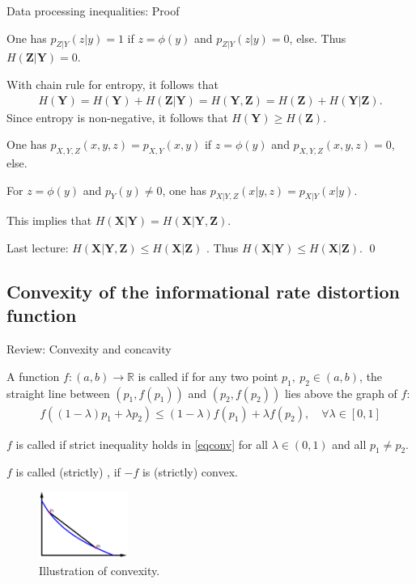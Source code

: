 \begin{frame}{Data processing inequalities: Proof}
\bit 
\item One has $p_{Z|Y}(z|y)=1$ if $z=\phi(y)$ and $p_{Z|Y}(z|y)=0$, else. Thus
$H(\mathbf{Z}|\mathbf{Y})=0$.
\item With chain rule for entropy, it follows that
\begin{align*}
H(\mathbf{Y})=H(\mathbf{Y})+H(\mathbf{Z}|\mathbf{Y})=H(\mathbf{Y},\mathbf{Z})=H(\mathbf{Z})+H(\mathbf{Y}|\mathbf{Z}).
\end{align*}
Since entropy is non-negative, it follows that $H(\mathbf{Y})\geq H(\mathbf{Z})$.
\item 
One has $p_{X,Y,Z}(x,y,z)=p_{X,Y}(x,y)$ if $z=\phi(y)$ and $p_{X,Y,Z}(x,y,z)=0$, else. 
\item For $z=\phi(y)$ and 
$p_Y(y)\neq 0$, one has $p_{X|Y,Z}(x|y,z)=p_{X|Y}(x|y)$.
\item[\iarrow] This implies that $H(\mathbf{X}|\mathbf{Y})=H(\mathbf{X}|\mathbf{Y},\mathbf{Z})$.
\item Last lecture: $H(\mathbf{X}|\mathbf{Y},\mathbf{Z})\leq H(\mathbf{X}|\mathbf{Z})$ .
Thus $H(\mathbf{X}|\mathbf{Y})\leq H(\mathbf{X}|\mathbf{Z})$. \qed
\eit 
\end{frame}


\subsection{Convexity of the informational rate distortion function}
\begin{frame}{Review: Convexity and concavity}
\bit
\item A function $f:(a,b)\to\mathbb{R}$ is called  if for any two point $p_1,\:p_2\in (a,b)$, the straight
line between $(p_1, f(p_1))$ and $(p_2, f(p_2))$ lies above the graph of $f$:
\begin{align}\label{eqconv}
f((1-\lambda)p_1+\lambda p_2)\leq (1-\lambda)f(p_1)+\lambda f(p_2), \quad \forall \lambda\in [0,1] 
\end{align}  
\item  $f$ is called  if strict inequality holds in \eqref{eqconv} for all $\lambda\in (0,1)$ and 
all $p_1\neq p_2$. 
\item $f$ is called (strictly) , if $-f$ is (strictly) convex.
\eit
\begin{figure}
\includegraphics[width=0.26\textwidth]{LosslessIII/RD_Plot_Convex_Final.png}
\captionsetup{labelformat=empty}
\caption{Illustration of convexity.}
\end{figure}
\end{frame}

